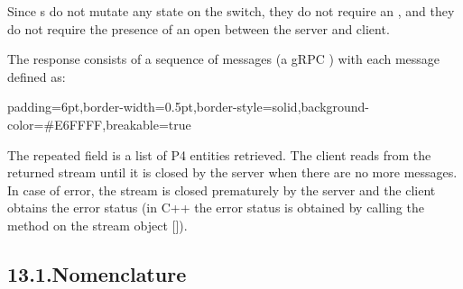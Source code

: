 \documentclass[11pt]{article}
\begin{document}
{%
Since s do not mutate any state on the switch, they do not
require an , and they do not require the presence of an open
 between the server and client.%

The response consists of a sequence of messages (a gRPC ) with
each message defined as:%

\begin{mdbmargintb}{6pt}{6pt}%
\begin{mdblock}{padding=6pt,border-width=0.5pt,border-style=solid,background-color=\#E6FFFF,breakable=true}%
\begin{mdpre}%
\end{mdpre}%
\end{mdblock}%
\end{mdbmargintb}%

\noindent{}The  repeated field is a list of P4 entities retrieved. The client
reads from the returned stream until it is closed by the server when there are
no more messages. In case of error, the stream is closed prematurely by the
server and the client obtains the error status (in C++ the error status is
obtained by calling the  method on the stream object
[]).%

\subsection{13.1.\hspace*{0.5em}Nomenclature}\label{sec-nomenclature}%

}
\end{document}
